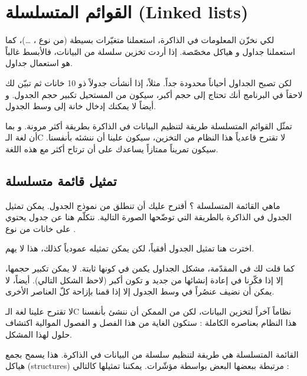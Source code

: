 \chapter{القوائم المتسلسلة (\textenglish{Linked lists})}

لكي نخزّن المعلومات في الذاكرة، استعملنا متغيّرات بسيطة (من نوع
،  \dots)،
كما استعملنا جداول و هياكل مخصّصة. إذا أردت تخزين سلسلة من البيانات، فالأبسط غالباً هو استعمال جداول. 

لكن تصبح الجداول أحياناً محدودة جداً. مثلاً، إذا أنشأت جدولاً ذو 10 خانات ثم تبيّن لك لاحقاً في البرنامج أنك تحتاج إلى حجم أكبر، سيكون من المستحيل تكبير حجم الجدول. و أيضاً لا يمكنك إدخال خانة إلى وسط الجدول.

تمثّل القوائم المتسلسلة طريقة لتنظيم البيانات في الذاكرة بطريقة أكثر مرونة. و بما أن لغة الـ\textenglish{C}
لا تقترح قاعدياً هذا النظام من التخزين، سيكون علينا أن ننشئه بأنفسنا. سيكون تمريناً ممتازاً يساعدك على أن ترتاح أكثر مع هذه اللغة.

\section{تمثيل قائمة متسلسلة}

ماهي القائمة المتسلسلة ؟ أقترح عليك أن تنطلق من نموذج الجدول. يمكن تمثيل الجدول في الذاكرة بالطريقة التي توضّحها الصورة التالية. نتكلّم هنا عن جدول يحتوي على خانات من نوع
.


\begin{information}
اخترت هنا تمثيل الجدول أفقياً، لكن يمكن تمثيله عمودياً كذلك، هذا لا يهم.
\end{information}


كما قلت لك في المقدّمة، مشكل الجداول يكمن في كونها ثابتة. لا يمكن تكبير حجمها، إلا إذا فكّرنا في إعادة إنشائها من جديد و تكون أكبر (لاحظ الشكل التالي). أيضاً، لا يمكن أن نضيف عنصُراً في وسط الجدول إلا إذا قمنا بإزاحة كلّ العناصر الأخرى.


لا تقترح علينا لغة الـ\textenglish{C}
نظاماً آخراً لتخزين البيانات، لكن من الممكن أن ننشئ بأنفسنا هذا النظام بعناصره الكاملة : ستكون الغاية من هذا الفصل و الفصول الموالية اكتشاف حلول لهذا المشكل.

القائمة المتسلسلة هي طريقة لتنظيم سلسلة من البيانات في الذاكرة. هذا يسمح بجمع هياكل
(\textenglish{structures})
مرتبطة ببعضها البعض بواسطة مؤشّرات. يمكننا تمثيلها كالتالي :


